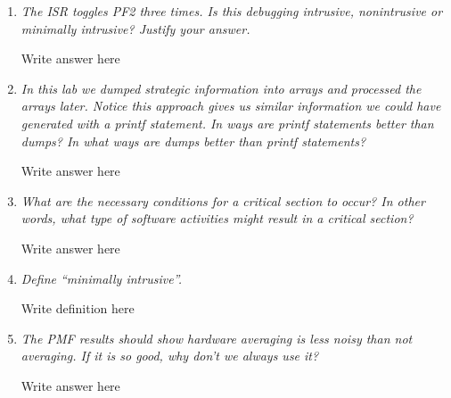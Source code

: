\documentclass{article}
\begin{document}
\begin{enumerate}
	\item \emph{The ISR toggles PF2 three times. Is this debugging intrusive,
		nonintrusive or minimally intrusive? Justify your answer.}

		Write answer here %

	\item \emph{In this lab we dumped strategic information into arrays and
		processed the arrays later. Notice this approach gives us similar
		information we could have generated with a printf statement. In ways
		are printf statements better than dumps? In what ways are dumps better
		than printf statements?}

		Write answer here %

	\item \emph{What are the necessary conditions for a critical section to
		occur? In other words, what type of software activities might result
		in a critical section?}

		Write answer here %

	\item \emph{Define “minimally intrusive”.}

		Write definition here %

	\item \emph{The PMF results should show hardware averaging is less noisy
		than not averaging. If it is so good, why don’t we always use it?}

		Write answer here %

\end{enumerate}
\end{document}
